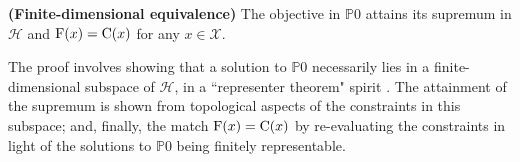 \begin{theorem}
	 \label{thm.main}
	 {\normalfont \textbf{(Finite-dimensional equivalence)}}
	The objective in $\mathds{P}0$ attains its supremum in $\mathcal{H}$ and ${\normalfont \text{F}}(x) = {\normalfont \text{C}}(x)$ for any $x \in \mathcal{X}$.
\end{theorem}

The proof involves showing that a solution to $\mathds{P}0$ necessarily lies in a finite-dimensional subspace of $\mathcal{H}$, in a ``representer theorem" spirit \citep{scholkopf2001generalized}. The attainment of the supremum is shown from topological aspects of the constraints in this subspace; and, finally, the match ${\normalfont \text{F}}(x) = {\normalfont \text{C}}(x)$ by re-evaluating the constraints in light of the solutions to $\mathds{P}0$ being finitely representable. 

